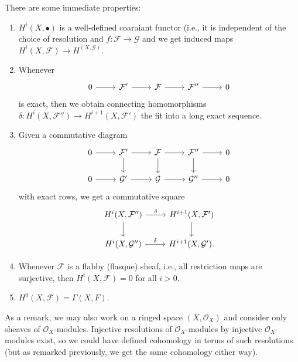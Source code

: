 There are some immediate properties:
\begin{enumerate}
	\item $H^i(X, \bullet)$ is a well-defined coaraiant functor (i.e., it is independent
		of the choice of resolution and $f\colon \mathcal{F}\to \mathcal{G}$ and we
		get induced maps $H^i(X, \mathcal{F})\to H^(X, \mathcal{G})$.
	\item Whenever
		\[\begin{tikzcd}
			0\ar[r] & \mathcal{F}'\ar[r] & \mathcal{F}\ar[r] & \mathcal{F}''\ar[r] & 0
		\end{tikzcd}\]
		is exact, then we obtain connecting homomorphisms
		$\delta\colon H^i(X, \mathcal{F}'')\to H^{i+1}(X, \mathcal{F}')$ the
		fit into a long exact sequence.
	\item Given a commutative diagram
		\[\begin{tikzcd}
			0\ar[r] & \mathcal{F}'\ar[r]\ar[d] & \mathcal{F}\ar[r]\ar[d] & \mathcal{F}''\ar[r]\ar[d] & 0\\
			0\ar[r] & \mathcal{G}'\ar[r] & \mathcal{G}\ar[r] & \mathcal{G}''\ar[r] & 0
		\end{tikzcd}\]
		with exact rows, we get a commutative square
		\[\begin{tikzcd}
			H^i(X, \mathcal{F}'') \ar[r, "\delta"]\ar[d] & H^{i+1}(X, \mathcal{F}')\ar[d]\\
			H^i(X, \mathcal{G}'')\ar[r, "\delta"] & H^{i+1}(X, \mathcal{G}').
		\end{tikzcd}\]
	\item Whenever $\mathcal{F}$ is a flabby (flasque) sheaf, i.e., all restriction
		maps are surjective, then $H^i(X, \mathcal{F}) = 0$ for all $i > 0$.
	\item $H^0(X, \mathcal{F}) = \Gamma(X, F)$.
\end{enumerate}

As a remark, we may also work on a ringed space $(X, \mathcal{O}_X)$ and consider
only sheaves of $\mathcal{O}_X$-modules. Injective resolutions of
$\mathcal{O}_X$-modules by injective $\mathcal{O}_X$-modules exist, so we could have
defined cohomology in terms of such resolutions (but as remarked previously,
we get the same cohomology either way).
